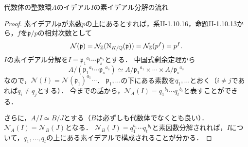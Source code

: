 \begin{screen}
  \begin{rem} \label{prime_decomposition}
    代数体の整数環$A$のイデアル$I$の素イデアル分解の流れ
  \end{rem}
\end{screen}
\begin{proof}
  素イデアル$ \mathfrak{p}$が素数$p$の上にあるとすれば，系II-1.10.16，命題II-1.10.13から，$f$を$ \mathfrak{p}/p$の相対次数として
  \[ \mathcal{N}( \mathfrak{p}) = \mathcal{N}_\mathbb{Z}( \operatorname{N}_{K/\mathbb{Q}}( \mathfrak{p})) = \mathcal{N}_\mathbb{Z}(p^f) = p^f. \]
  $I$の素イデアル分解を$I = \mathfrak{p}_1{}^{a_1} \cdots \mathfrak{p}_{s}^{a_s}$とする．
  中国式剰余定理から
  \[A/( \mathfrak{p}_1{}^{a_1} \cdots \mathfrak{p}_s{}^{a_s}) \simeq A/\mathfrak{p}_1{}^{a_1} \times \cdots \times A/\mathfrak{p}_s{}^{a_s} \]
  なので，$ \mathcal{N}(I) = \mathcal{N}( \mathfrak{p}_1)^{a_1} \cdots$．
  $ \mathfrak{p}_1, \ldots$の下にある素数を$q_1, \ldots$とおく（$i \neq j$であれば$q_i \neq q_j$とする）．
  今までの話から，$ \mathcal{N}_A(I) = q_1{}^{b_1} \cdots q_t{}^{b_t}$と表すことができる．

  さらに，$A/I \simeq B/J$とする（$B$は必ずしも代数体でなくとも良い）．$ \mathcal{N}_A(I) = \mathcal{N}_B(J)$となる．
  $ \mathcal{N}_B(J) = q_1^{b_1} \cdots q_t{}^{b_t}$と素因数分解されれば，$I$について，$q_1, \ldots, q_t$の上にある素イデアルで構成されることが分かる．

\end{proof}

